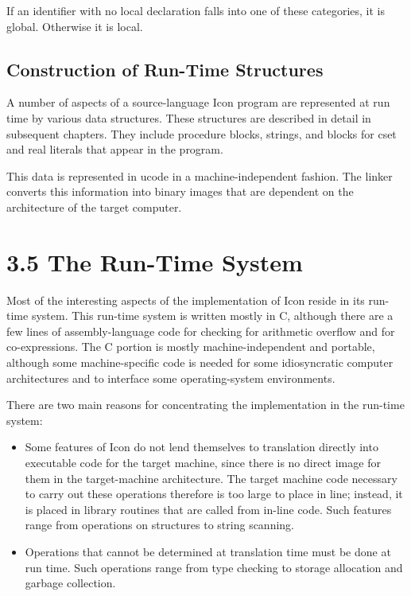 If an identifier with no local declaration falls into one of these
categories, it is global. Otherwise it is local.

\subsection{Construction of Run-Time Structures}

A number of aspects of a source-language Icon program are represented
at run time by various data structures. These structures are described
in detail in subsequent chapters. They include procedure blocks,
strings, and blocks for cset and real literals that appear in the
program.


This data is represented in ucode in a machine-independent
fashion. The linker converts this information into binary images that
are dependent on the architecture of the target computer.

\section[3.5 The Run{}-Time System]{3.5 The Run-Time System}

Most of the interesting aspects of the implementation of Icon reside
in its run-time system. This run-time system is written mostly in C,
although there are a few lines of assembly-language code for checking
for arithmetic overflow and for co-expressions. The C portion is
mostly machine-independent and portable, although some
machine-specific code is needed for some idiosyncratic computer
architectures and to interface some operating-system environments.

There are two main reasons for concentrating the implementation in the
run-time system:

\liststyleLiii
\begin{itemize}

\item Some features of Icon do not lend themselves to translation
directly into executable code for the target machine, since there is
no direct image for them in the target-machine architecture. The
target machine code necessary to carry out these operations therefore
is too large to place in line; instead, it is placed in library
routines that are called from in-line code. Such features range from
operations on structures to string scanning.

\item Operations that cannot be determined at translation time must be
done at run time. Such operations range from type checking to storage
allocation and garbage collection.

\end{itemize}

